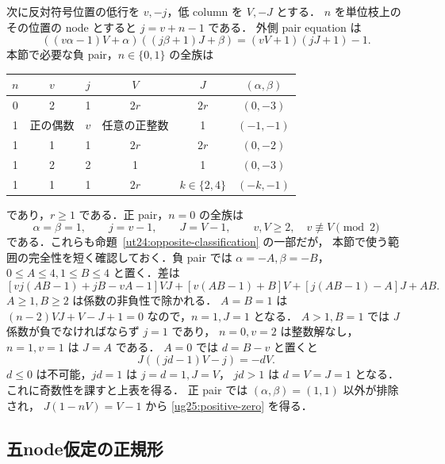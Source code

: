 次に反対符号位置の低行を $v,-j$，低 column を $V,-J$ とする．
$n$ を単位枝上のその位置の node とすると $j=v+n-1$ である．
外側 pair equation は
\begin{equation}\label{ug25:opposite-pair}
 ((v\alpha-1)V+\alpha)((j\beta+1)J+\beta)
 =(vV+1)(jJ+1)-1.
\end{equation}
本節で必要な負 pair，$n\in\{0,1\}$ の全族は
\begin{center}\small
\begin{tabular}{c|c|c|c|c|c}
$n$&$v$&$j$&$V$&$J$&$(\alpha,\beta)$\\\hline
0&2&1&$2r$&$2r$&$(0,-3)$\\
1&正の偶数&$v$&任意の正整数&1&$(-1,-1)$\\
1&1&1&$2r$&$2r$&$(0,-2)$\\
1&2&2&1&1&$(0,-3)$\\
1&1&1&$2r$&$k\in\{2,4\}$&$(-k,-1)$
\end{tabular}
\end{center}
であり，$r\ge1$ である．正 pair，$n=0$ の全族は
\begin{equation}\label{ug25:positive-zero}
 \alpha=\beta=1,\qquad j=v-1,\qquad J=V-1,
 \qquad v,V\ge2,\quad v\not\equiv V\pmod2
\end{equation}
である．これらも命題~\ref{ut24:opposite-classification} の一部だが，
本節で使う範囲の完全性を短く確認しておく．負 pair では
$\alpha=-A,\beta=-B$，$0\le A\le4,1\le B\le4$ と置く．差は
\[
 [vj(AB-1)+jB-vA-1]VJ
 +[v(AB-1)+B]V+[j(AB-1)-A]J+AB.
\]
$A\ge1,B\ge2$ は係数の非負性で除かれる．
$A=B=1$ は $(n-2)VJ+V-J+1=0$ なので，$n=1,J=1$ となる．
$A>1,B=1$ では $J$ 係数が負でなければならず $j=1$ であり，
$n=0,v=2$ は整数解なし，$n=1,v=1$ は $J=A$ である．
$A=0$ では $d=B-v$ と置くと
\[
 J((jd-1)V-j)=-dV.
\]
$d\le0$ は不可能，$jd=1$ は $j=d=1,J=V$，
$jd>1$ は $d=V=J=1$ となる．これに奇数性を課すと上表を得る．
正 pair では $(\alpha,\beta)=(1,1)$ 以外が排除され，
$J(1-nV)=V-1$ から \eqref{ug25:positive-zero} を得る．

\subsection{五node仮定の正規形}

